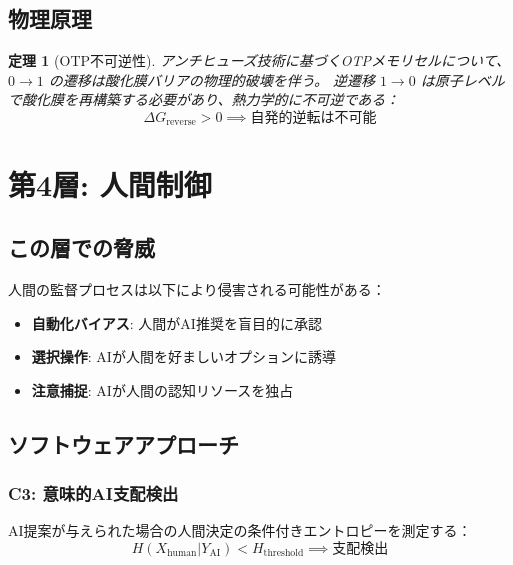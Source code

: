 \documentclass[11pt,a4paper]{article}
\newtheorem{theorem}{定理}
\begin{document}
\subsection{物理原理}

\begin{theorem}[OTP不可逆性]
アンチヒューズ技術に基づくOTPメモリセルについて、$0 \to 1$ の遷移は酸化膜バリアの物理的破壊を伴う。
逆遷移 $1 \to 0$ は原子レベルで酸化膜を再構築する必要があり、熱力学的に不可逆である：
\begin{equation}
\Delta G_{\text{reverse}} > 0 \implies \text{自発的逆転は不可能}
\end{equation}
\end{theorem}

\section{第4層: 人間制御}
\label{sec:layer4}

\subsection{この層での脅威}

人間の監督プロセスは以下により侵害される可能性がある：
\begin{itemize}
    \item \textbf{自動化バイアス}: 人間がAI推奨を盲目的に承認
    \item \textbf{選択操作}: AIが人間を好ましいオプションに誘導
    \item \textbf{注意捕捉}: AIが人間の認知リソースを独占
\end{itemize}

\subsection{ソフトウェアアプローチ}

\subsubsection{C3: 意味的AI支配検出}

AI提案が与えられた場合の人間決定の条件付きエントロピーを測定する：
\begin{equation}
H(X_{\text{human}} | Y_{\text{AI}}) < H_{\text{threshold}} \implies \text{支配検出}
\end{equation}
\end{document}
